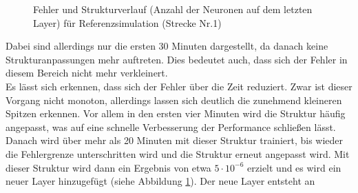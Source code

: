                 \begin{figure}[h]
                    \caption{Fehler und Strukturverlauf (Anzahl der Neuronen auf dem letzten Layer) für Referenzsimulation (Strecke Nr.1)}
                    \label{Abb:RealTime_Testreihe1}
                \end{figure}
                Dabei sind allerdings nur die ersten 30 Minuten dargestellt, da danach keine Strukturanpassungen mehr auftreten. Dies bedeutet auch, dass sich der Fehler in 
                diesem Bereich nicht mehr verkleinert.\\
                Es lässt sich erkennen, dass sich der Fehler über die Zeit reduziert. Zwar ist dieser Vorgang nicht monoton, allerdings lassen sich deutlich die zunehmend kleineren
                Spitzen erkennen. Vor allem in den ersten vier Minuten wird die Struktur häufig angepasst, was auf eine schnelle Verbesserung der Performance schließen lässt. 
                Danach wird über mehr als 20 Minuten mit dieser Struktur trainiert, bis wieder die Fehlergrenze unterschritten wird und die Struktur erneut angepasst wird. Mit 
                dieser Struktur wird dann ein Ergebnis von etwa $5 \cdot 10^{-6}$ erzielt und es wird ein neuer Layer hinzugefügt (siehe Abbildung \ref{Abb:RealTime_Testreihe1}). Der neue Layer entsteht an 
